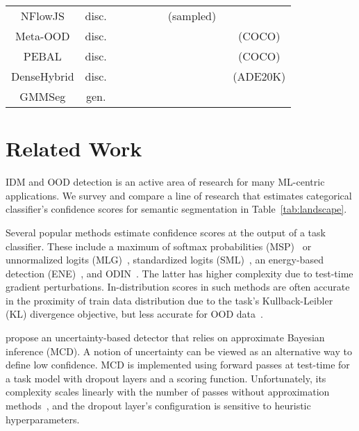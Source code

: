 \documentclass[accepted, startpage]{uai2023}
\newcommand{\cmark}{\ding{51}}
\newcommand{\xmark}{\ding{55}}
\begin{document}
\begin{table*}[ht]
\begin{tabular}{c|c|c|c|c|c|c|c}
		\midrule
		NFlowJS                             & disc. & \xmark & \xmark             & \xmark & \cmark & \cmark~(sampled) & \xmark \\
Meta-OOD                            & disc. & \xmark & \xmark             & \xmark & \cmark & \cmark & \cmark~(COCO) \\
		PEBAL                               & disc. & \xmark & \xmark             & \xmark & \cmark & \xmark & \cmark~(COCO) \\
		DenseHybrid                         & disc. & \xmark & \xmark             & \cmark & \cmark & \xmark & \cmark~(ADE20K) \\
		GMMSeg                              & gen.  & \xmark & \xmark             & \xmark & \cmark & \xmark & \xmark \\
		\bottomrule
	\end{tabular}
\end{table*}

\section{Related Work}\label{sec:related}
IDM and OOD detection is an active area of research for many ML-centric applications. We survey and compare a line of research that estimates categorical classifier's confidence scores for semantic segmentation in Table~\ref{tab:landscape}.

Several popular methods estimate confidence scores at the output of a task classifier. These include a maximum of softmax probabilities (MSP)~\citep{hendrycks17baseline} or unnormalized logits (MLG)~\citep{hendrycks2020scaling}, standardized logits (SML)~\citep{Jung_2021_ICCV}, an energy-based detection (ENE)~\citep{NEURIPS2020_f5496252}, and ODIN~\citep{liang2018enhancing}. The latter has higher complexity due to test-time gradient perturbations. In-distribution scores in such methods are often accurate in the proximity of train data distribution due to the task's Kullback-Leibler (KL) divergence objective, but less accurate for OOD data~\citep{NEURIPS2019_8ca01ea9}.

\citet{ken} propose an uncertainty-based detector that relies on approximate Bayesian inference (MCD). A notion of uncertainty can be viewed as an alternative way to define low confidence. MCD is implemented using forward passes at test-time for a task model with dropout layers and a scoring function. Unfortunately, its complexity scales linearly with the number of passes without approximation methods~\citep{Postels_2019_ICCV}, and the dropout layer's configuration is sensitive to heuristic hyperparameters.
\end{document}
